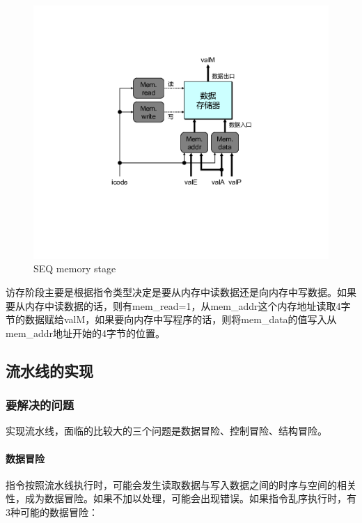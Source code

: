 \begin{figure}[htbp]
\centering
\includegraphics{img/seq-memory.png}
\caption{SEQ memory stage}
\end{figure}

访存阶段主要是根据指令类型决定是要从内存中读数据还是向内存中写数据。如果要从内存中读数据的话，则有mem\_read=1，从mem\_addr这个内存地址读取4字节的数据赋给valM，如果要向内存中写程序的话，则将mem\_data的值写入从mem\_addr地址开始的4字节的位置。

\subsection{流水线的实现}\label{ux6d41ux6c34ux7ebfux7684ux5b9eux73b0}

\subsubsection{要解决的问题}\label{ux8981ux89e3ux51b3ux7684ux95eeux9898}

实现流水线，面临的比较大的三个问题是数据冒险、控制冒险、结构冒险。

\paragraph{数据冒险}\label{ux6570ux636eux5192ux9669}

指令按照流水线执行时，可能会发生读取数据与写入数据之间的时序与空间的相关性，成为数据冒险。如果不加以处理，可能会出现错误。如果指令乱序执行时，有3种可能的数据冒险：


